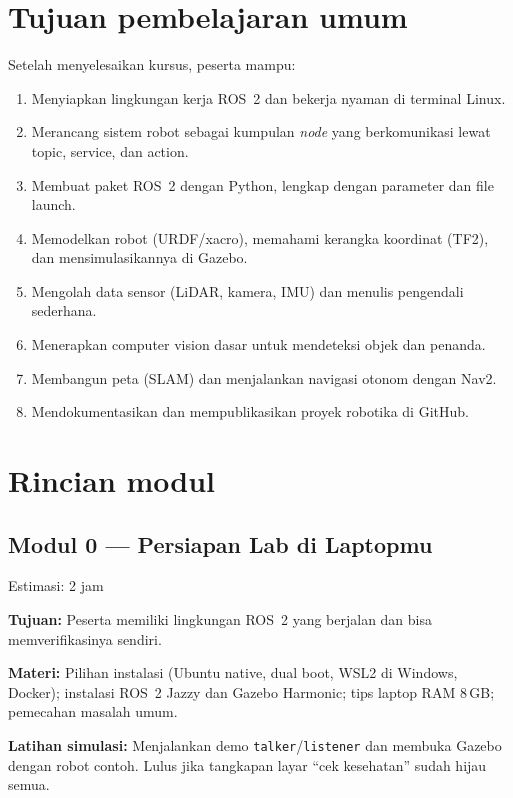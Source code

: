 \documentclass{rtl}
\begin{document}
\section*{Tujuan pembelajaran umum}
Setelah menyelesaikan kursus, peserta mampu:
\begin{enumerate}
  \item Menyiapkan lingkungan kerja ROS~2 dan bekerja nyaman di terminal Linux.
  \item Merancang sistem robot sebagai kumpulan \emph{node} yang berkomunikasi lewat topic, service, dan action.
  \item Membuat paket ROS~2 dengan Python, lengkap dengan parameter dan file launch.
  \item Memodelkan robot (URDF/xacro), memahami kerangka koordinat (TF2), dan mensimulasikannya di Gazebo.
  \item Mengolah data sensor (LiDAR, kamera, IMU) dan menulis pengendali sederhana.
  \item Menerapkan computer vision dasar untuk mendeteksi objek dan penanda.
  \item Membangun peta (SLAM) dan menjalankan navigasi otonom dengan Nav2.
  \item Mendokumentasikan dan mempublikasikan proyek robotika di GitHub.
\end{enumerate}

\section*{Rincian modul}

\newcommand{\modul}[5]{%
  \subsection*{#1}
  {\small\color{rtlgray}Estimasi: #2}\par
  \textbf{Tujuan:} #3\par
  \textbf{Materi:} #4\par
  \textbf{Latihan simulasi:} #5\par}

\modul{Modul 0 --- Persiapan Lab di Laptopmu}{2 jam}
{Peserta memiliki lingkungan ROS~2 yang berjalan dan bisa memverifikasinya sendiri.}
{Pilihan instalasi (Ubuntu native, dual boot, WSL2 di Windows, Docker); instalasi ROS~2 Jazzy dan Gazebo Harmonic; tips laptop RAM 8\,GB; pemecahan masalah umum.}
{Menjalankan demo \texttt{talker}/\texttt{listener} dan membuka Gazebo dengan robot contoh. Lulus jika tangkapan layar ``cek kesehatan'' sudah hijau semua.}
\end{document}
